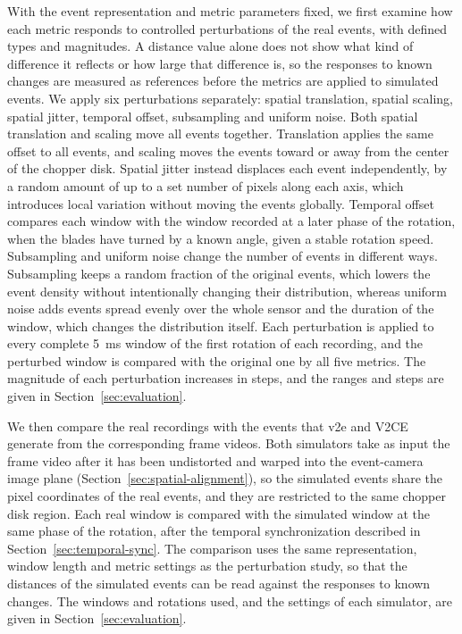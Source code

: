 With the event representation and metric parameters fixed, we first examine how each metric responds to controlled perturbations of the real events, with defined types and magnitudes. A distance value alone does not show what kind of difference it reflects or how large that difference is, so the responses to known changes are measured as references before the metrics are applied to simulated events. We apply six perturbations separately: spatial translation, spatial scaling, spatial jitter, temporal offset, subsampling and uniform noise. Both spatial translation and scaling move all events together. Translation applies the same offset to all events, and scaling moves the events toward or away from the center of the chopper disk. Spatial jitter instead displaces each event independently, by a random amount of up to a set number of pixels along each axis, which introduces local variation without moving the events globally. Temporal offset compares each window with the window recorded at a later phase of the rotation, when the blades have turned by a known angle, given a stable rotation speed. Subsampling and uniform noise change the number of events in different ways. Subsampling keeps a random fraction of the original events, which lowers the event density without intentionally changing their distribution, whereas uniform noise adds events spread evenly over the whole sensor and the duration of the window, which changes the distribution itself. Each perturbation is applied to every complete 5~ms window of the first rotation of each recording, and the perturbed window is compared with the original one by all five metrics. The magnitude of each perturbation increases in steps, and the ranges and steps are given in Section~\ref{sec:evaluation}.

We then compare the real recordings with the events that v2e and V2CE generate from the corresponding frame videos. Both simulators take as input the frame video after it has been undistorted and warped into the event-camera image plane (Section~\ref{sec:spatial-alignment}), so the simulated events share the pixel coordinates of the real events, and they are restricted to the same chopper disk region. Each real window is compared with the simulated window at the same phase of the rotation, after the temporal synchronization described in Section~\ref{sec:temporal-sync}. The comparison uses the same representation, window length and metric settings as the perturbation study, so that the distances of the simulated events can be read against the responses to known changes. The windows and rotations used, and the settings of each simulator, are given in Section~\ref{sec:evaluation}.

